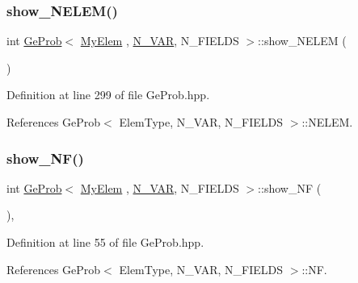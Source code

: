 \subsubsection{\texorpdfstring{show\+\_\+\+N\+E\+L\+E\+M()}{show\_NELEM()}}
{\footnotesize\ttfamily int \hyperlink{classGeProb}{Ge\+Prob}$<$ \hyperlink{DG__Prob_8h_a83cd887ced9a6587428f267e50cd4787}{My\+Elem} , \hyperlink{classED__Prob_a4e7d2ff1a8e435e336fb00c527224b5a}{N\+\_\+\+V\+AR}, N\+\_\+\+F\+I\+E\+L\+DS $>$\+::show\+\_\+\+N\+E\+L\+EM (\begin{DoxyParamCaption}{ }\end{DoxyParamCaption})\hspace{0.3cm}{\ttfamily [inherited]}}



Definition at line 299 of file Ge\+Prob.\+hpp.



References Ge\+Prob$<$ Elem\+Type, N\+\_\+\+V\+A\+R, N\+\_\+\+F\+I\+E\+L\+D\+S $>$\+::\+N\+E\+L\+EM.

\mbox{\label{classGeProb_ac7f36c8a5ae46b8ddc8cdd8db059e9cc}} 
\subsubsection{\texorpdfstring{show\+\_\+\+N\+F()}{show\_NF()}}
{\footnotesize\ttfamily int \hyperlink{classGeProb}{Ge\+Prob}$<$ \hyperlink{DG__Prob_8h_a83cd887ced9a6587428f267e50cd4787}{My\+Elem} , \hyperlink{classED__Prob_a4e7d2ff1a8e435e336fb00c527224b5a}{N\+\_\+\+V\+AR}, N\+\_\+\+F\+I\+E\+L\+DS $>$\+::show\+\_\+\+NF (\begin{DoxyParamCaption}{ }\end{DoxyParamCaption})\hspace{0.3cm}{\ttfamily [inline]}, {\ttfamily [inherited]}}



Definition at line 55 of file Ge\+Prob.\+hpp.



References Ge\+Prob$<$ Elem\+Type, N\+\_\+\+V\+A\+R, N\+\_\+\+F\+I\+E\+L\+D\+S $>$\+::\+NF.

\mbox{\label{classGeProb_a2f37b74c21a3bdc3fc112babc8a0123b}} 
